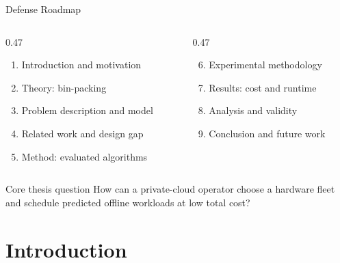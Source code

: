 \documentclass[aspectratio=169,10pt]{beamer}
\begin{document}
\begin{frame}{Defense Roadmap}
  \begin{columns}[T,totalwidth=\textwidth]
    \begin{column}{0.47\textwidth}
      \begin{enumerate}
        \item Introduction and motivation
        \item Theory: bin-packing
        \item Problem description and model
        \item Related work and design gap
        \item Method: evaluated algorithms
      \end{enumerate}
    \end{column}
    \begin{column}{0.47\textwidth}
      \begin{enumerate}
        \setcounter{enumi}{5}
        \item Experimental methodology
        \item Results: cost and runtime
        \item Analysis and validity
        \item Conclusion and future work
      \end{enumerate}
    \end{column}
  \end{columns}
  \vspace{0.35cm}
  \begin{block}{Core thesis question}
    How can a private-cloud operator choose a hardware fleet and schedule predicted offline workloads at low total cost?
  \end{block}
\end{frame}

\section{Introduction}
\end{document}
